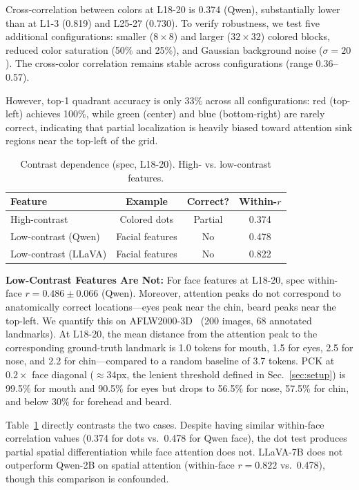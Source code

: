 \documentclass[10pt,twocolumn,letterpaper]{article}
\begin{document}
Cross-correlation between colors at L18-20 is 0.374 (Qwen), substantially lower than at L1-3 (0.819) and L25-27 (0.730). To verify robustness, we test five additional configurations: smaller ($8\times8$) and larger ($32\times32$) colored blocks, reduced color saturation (50\% and 25\%), and Gaussian background noise ($\sigma=20$). The cross-color correlation remains stable across configurations (range 0.36--0.57).

However, top-1 quadrant accuracy is only 33\% across all configurations: red (top-left) achieves 100\%, while green (center) and blue (bottom-right) are rarely correct, indicating that partial localization is heavily biased toward attention sink regions near the top-left of the grid.

\begin{table}[t]
\centering

\caption{Contrast dependence (spec, L18-20). High- vs. low-contrast features.}
\label{tab:contrast}
\footnotesize\setlength{\tabcolsep}{2pt}
\begin{tabular}{lccc}
\toprule
Feature & Example & Correct? & Within-$r$ \\
\midrule
High-contrast & Colored dots & Partial & 0.374 \\
Low-contrast (Qwen) & Facial features & No & 0.478 \\
Low-contrast (LLaVA) & Facial features & No & 0.822 \\
\bottomrule
\end{tabular}
\end{table}

\textbf{Low-Contrast Features Are Not:} For face features at L18-20, spec within-face $r=0.486\pm0.066$ (Qwen). Moreover, attention peaks do not correspond to anatomically correct locations---eyes peak near the chin, beard peaks near the top-left. We quantify this on AFLW2000-3D~\cite{Zhu2019face} (200 images, 68 annotated landmarks). At L18-20, the mean distance from the attention peak to the corresponding ground-truth landmark is 1.0 tokens for mouth, 1.5 for eyes, 2.5 for nose, and 2.2 for chin---compared to a random baseline of 3.7 tokens. PCK at $0.2\times$ face diagonal ($\approx$34px, the lenient threshold defined in Sec.~\ref{sec:setup}) is 99.5\% for mouth and 90.5\% for eyes but drops to 56.5\% for nose, 57.5\% for chin, and below 30\% for forehead and beard.

Table~\ref{tab:contrast} directly contrasts the two cases. Despite having similar within-face correlation values (0.374 for dots vs.\ 0.478 for Qwen face), the dot test produces partial spatial differentiation while face attention does not. LLaVA-7B does not outperform Qwen-2B on spatial attention (within-face $r=0.822$ vs.\ 0.478), though this comparison is confounded.
\end{document}

